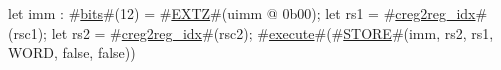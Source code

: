 let imm : #\hyperref[sailRISCVzbits]{bits}#(12) = #\hyperref[sailRISCVzEXTZ]{EXTZ}#(uimm @ 0b00);
let rs1 = #\hyperref[sailRISCVzcreg2regzyidx]{creg2reg\_idx}#(rsc1);
let rs2 = #\hyperref[sailRISCVzcreg2regzyidx]{creg2reg\_idx}#(rsc2);
#\hyperref[sailRISCVzexecute]{execute}#(#\hyperref[sailRISCVzSTORE]{STORE}#(imm, rs2, rs1, WORD, false, false))
